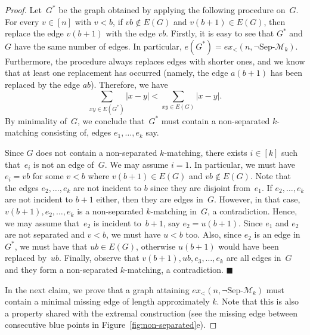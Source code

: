 \documentclass[11pt]{article}
\theoremstyle{definition}
\newcommand{\qedclaim}{\hfill$\blacksquare$}
\newenvironment{proofclaim}{\removelastskip\penalty55\medskip\noindent{\it Proof of the claim. }}{\medskip}
\begin{document}
\begin{proof}
\begin{proofclaim}
        Let~$G^*$ be the graph obtained by applying the following procedure on~$G$.
        For every $v\in[n]$ with $v<b$, if $vb\notin E(G)$ and $v(b{+}1)\in E(G)$, then replace the edge $v(b{+}1)$ with the edge $vb$.
        Firstly, it is easy to see that $G^*$ and $G$ have the same number of edges.
        In particular, $e(G^*)=ex_<(n,\neg\text{Sep-}\mathcal M_k)$.
        Furthermore, the procedure always replaces edges with shorter ones, and we know that at least one replacement has occurred (namely, the edge $a(b{+}1)$ has been replaced by the edge $ab$).
        Therefore, we have
        $$\sum_{xy\in E(G^*)}|x-y|<\sum_{xy\in E(G)}|x-y|.$$
        By minimality of~$G$, we conclude that~$G^*$ must contain a non-separated $k$-matching consisting of, edges $e_1,\dots,e_k$ say.
        
        Since $G$ does not contain a non-separated $k$-matching, there exists $i\in[k]$ such that~$e_i$ is not an edge of~$G$.
        We may assume $i=1$.
        In particular, we must have $e_i=vb$ for some $v<b$ where $v(b{+}1)\in E(G)$ and $vb\notin E(G)$.
        Note that the edges $e_2,\dots,e_k$ are not incident to $b$ since they are disjoint from~$e_1$.
        If $e_2,\dots,e_k$ are not incident to $b+1$ either, then they are edges in~$G$.
        However, in that case, $v(b{+}1),e_2,\dots,e_k$ is a non-separated $k$-matching in~$G$, a contradiction.
        Hence, we may assume that~$e_2$ is incident to~$b+1$, say $e_2=u(b{+}1)$.
        Since $e_1$ and $e_2$ are not separated and $v<b$, we must have $u<b$ too.
        Also, since $e_2$ is an edge in $G^*$, we must have that $ub\in E(G)$, otherwise $u(b{+}1)$ would have been replaced by~$ub$.
        Finally, observe that $v(b{+}1),ub,e_3,\dots,e_k$ are all edges in~$G$ and they form a non-separated $k$-matching, a contradiction.
        \qedclaim        
    \end{proofclaim}

    In the next claim, we prove that a graph attaining $ex_<(n,\neg\text{Sep-}\mathcal M_k)$ must contain a minimal missing edge of length approximately $k$.
    Note that this is also a property shared with the extremal construction (see the missing edge between consecutive blue points in Figure~\ref{fig:non-separated}e).


\end{proof}
\end{document}
